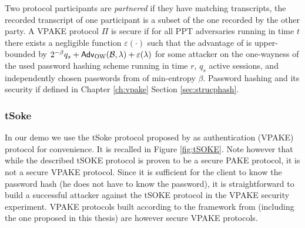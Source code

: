 \noindent
Two protocol participants are \emph{partnered} if they have matching transcripts, \ie the recorded transcript of one participant is a subset of the one recorded by the other party.
A \ac{VPAKE} protocol $\Pi$ is secure if for all \ac{PPT} adversaries \cA running in time $t$ there exists a negligible function $\varepsilon(\cdot)$ such that the advantage of \cA is upper-bounded by
$2^{-\beta}q_s + \mathsf{Adv}_{\text{OW}}(\mathcal{B}, \lambda) + \varepsilon(\lambda)$
for some attacker \cB on the one-wayness of the used password hashing scheme running in time $r$, $q_s$ active sessions, and independently chosen passwords from \cD of min-entropy $\beta$.
Password hashing and its security if defined in Chapter \ref{ch:vpake} Section \ref{sec:strucphash}.


\subsubsection{tSoke} \label{sec:tsoke}
In our demo we use the tSoke protocol proposed by \citet{Manulis2014} as authentication (\ac{VPAKE}) protocol for convenience.
It is recalled in Figure \ref{fig:tSOKE}.
Note however that while the described tSOKE protocol is proven to be a secure \ac{PAKE} protocol, it is not a secure \ac{VPAKE} protocol.
Since it is sufficient for the client to know the password hash (he does not have to know the password), it is straightforward to build a successful attacker against the tSOKE protocol in the \ac{VPAKE} security experiment.
\ac{VPAKE} protocols built according to the framework from \citet{BenhamoudaP13} (including the one proposed in this thesis) are however secure \ac{VPAKE} protocols.

